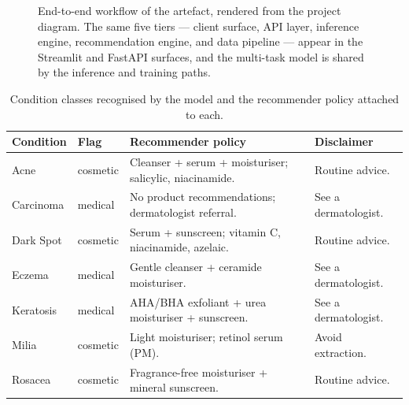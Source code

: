 \documentclass[11pt,a4paper]{article}
\begin{document}
\begin{figure}[!ht]
  \caption{End-to-end workflow of the artefact, rendered from the
           project diagram. The same five tiers --- client surface,
           API layer, inference engine, recommendation engine, and data
           pipeline --- appear in the Streamlit and FastAPI surfaces,
           and the multi-task model is shared by the inference and
           training paths.}
  \label{fig:workflow}
\end{figure}

\begin{table}[!ht]
  \centering
  \caption{Condition classes recognised by the model and the recommender
           policy attached to each.}
  \label{tab:conditions}
  \begin{tabularx}{\linewidth}{@{}p{2.4cm} p{2.0cm} X p{2.6cm}@{}}
    \toprule
    \textbf{Condition} & \textbf{Flag} & \textbf{Recommender policy} & \textbf{Disclaimer} \\
    \midrule
    Acne        & cosmetic & Cleanser + serum + moisturiser; salicylic, niacinamide. & Routine advice. \\
    Carcinoma   & medical  & No product recommendations; dermatologist referral.        & See a dermatologist. \\
    Dark Spot   & cosmetic & Serum + sunscreen; vitamin C, niacinamide, azelaic.       & Routine advice. \\
    Eczema      & medical  & Gentle cleanser + ceramide moisturiser.                   & See a dermatologist. \\
    Keratosis   & medical  & AHA/BHA exfoliant + urea moisturiser + sunscreen.         & See a dermatologist. \\
    Milia       & cosmetic & Light moisturiser; retinol serum (PM).                    & Avoid extraction. \\
    Rosacea     & cosmetic & Fragrance-free moisturiser + mineral sunscreen.           & Routine advice. \\
    \bottomrule
  \end{tabularx}
\end{table}
\end{document}
